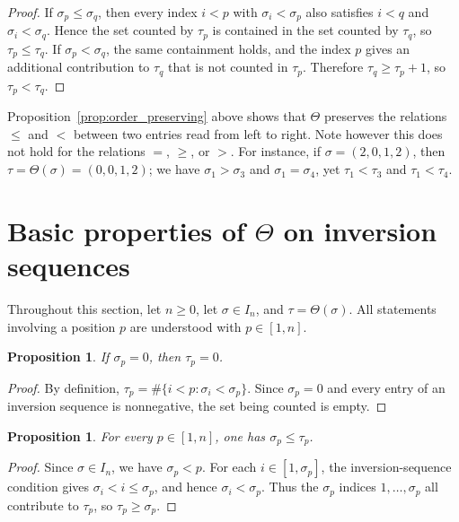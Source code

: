 \documentclass[11pt]{article}
\newtheorem{prop}[thm]{Proposition}
\theoremstyle{remark}
\theoremstyle{definition}
\begin{document}
\begin{proof}
If $\sigma_p\leq\sigma_q$, then every index $i<p$ with $\sigma_i<\sigma_p$ also satisfies $i<q$ and $\sigma_i<\sigma_q$. Hence the set counted by $\tau_p$ is contained in the set counted by $\tau_q$, so $\tau_p\leq\tau_q$. If $\sigma_p<\sigma_q$, the same containment holds, and the index $p$ gives an additional contribution to $\tau_q$ that is not counted in $\tau_p$. Therefore $\tau_q\geq\tau_p+1$, so $\tau_p<\tau_q$.
\end{proof}

Proposition~\ref{prop:order_preserving} above shows that $\Theta$ preserves the relations $\leq$ and $<$ between two entries read from left to right. Note however this does not hold for the relations $=$, $\geq$, or $>$. For instance, if $\sigma = (2,0,1,2)$, then $\tau = \Theta(\sigma) = (0,0,1,2)$; we have $\sigma_1 > \sigma_3$ and $\sigma_1 = \sigma_4$, yet $\tau_1 < \tau_3$ and $\tau_1 < \tau_4$.


\section{Basic properties of \texorpdfstring{$\Theta$}{Θ} on inversion sequences}

Throughout this section, let $n\geq0$, let $\sigma\in I_n$, and $\tau=\Theta(\sigma)$. All statements involving a position $p$ are understood with $p\in[1,n]$.

\begin{prop}\label{prop:zeros_preserved}
If $\sigma_p=0$, then $\tau_p=0$.
\end{prop}

\begin{proof}
By definition, $\tau_p=\#\{i<p:\sigma_i<\sigma_p\}$. Since $\sigma_p=0$ and every entry of an inversion sequence is nonnegative, the set being counted is empty.
\end{proof}

\begin{prop}\label{prop:value_increase}
For every $p\in[1,n]$, one has $\sigma_p\leq\tau_p$.
\end{prop}

\begin{proof}
Since $\sigma\in I_n$, we have $\sigma_p<p$. For each $i\in[1,\sigma_p]$, the inversion-sequence condition gives $\sigma_i<i\leq\sigma_p$, and hence $\sigma_i<\sigma_p$. Thus the $\sigma_p$ indices $1,\ldots,\sigma_p$ all contribute to $\tau_p$, so $\tau_p\geq\sigma_p$.
\end{proof}
\end{document}
